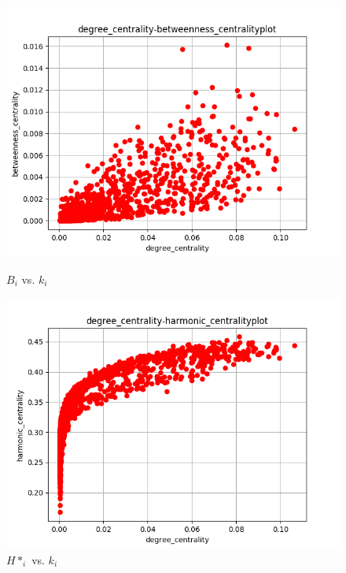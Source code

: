\documentclass[runningheads]{llncs}
\begin{document}
\begin{figure}
    \centering
    \begin{minipage}{0.5\textwidth}
        \centering
        \includegraphics[width=\textwidth]{3a_degree_centrality-betweenness_centralityplot} %
        \caption{\(B_{i}\) vs. \(k_{i}\)}
        \label{fig_3a_degreebet_centralityplot}
    \end{minipage}\hfill
    \begin{minipage}{0.5\textwidth}
        \centering
        \includegraphics[width=\textwidth]{3a_degree_centrality-harmonic_centralityplot} %
        \caption{\(H*_{i}\)  vs.  \(k_{i}\)}
        \label{fig_3a_degree_harmonic_centralityplot}
    \end{minipage}
\end{figure}
\end{document}
